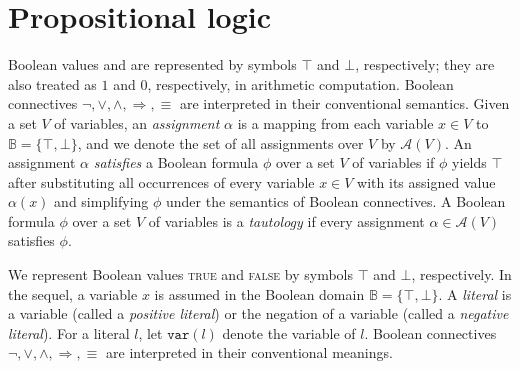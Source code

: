 \section{Propositional logic}
\label{sect:propositional-logic}

Boolean values \true and \false are represented by symbols $\top$ and $\bot$, respectively;
they are also treated as $1$ and $0$, respectively, in arithmetic computation.
Boolean connectives $\lnot, \lor, \land, \Rightarrow, \equiv$ are interpreted in their conventional semantics.
Given a set $V$ of variables,
an \textit{assignment} $\alpha$ is a mapping from each variable $x\in V$ to $\mathbb{B}=\{\top,\bot\}$,
and we denote the set of all assignments over $V$ by $\mathcal{A}(V)$.
An assignment $\alpha$ \textit{satisfies} a Boolean formula $\phi$ over a set $V$ of variables if $\phi$ yields $\top$ after substituting all occurrences of every variable $x\in V$ with its assigned value $\alpha(x)$ and simplifying $\phi$ under the semantics of Boolean connectives.
A Boolean formula $\phi$ over a set $V$ of variables is a \textit{tautology} if every assignment $\alpha\in \mathcal{A}(V)$ satisfies $\phi$.

We represent Boolean values \textsc{true} and \textsc{false} by symbols $\top$ and $\bot$, respectively.
In the sequel, a variable $x$ is assumed in the Boolean domain $\mathbb{B} = \{\top, \bot\}$.
A \emph{literal} is a variable (called a \emph{positive literal}) or the negation of a variable (called a \emph{negative literal}).
For a literal $l$, let $\mathtt{var}(l)$ denote the variable of $l$.
Boolean connectives $\neg, \vee, \wedge, \Rightarrow, \equiv$ are interpreted in their conventional meanings.


